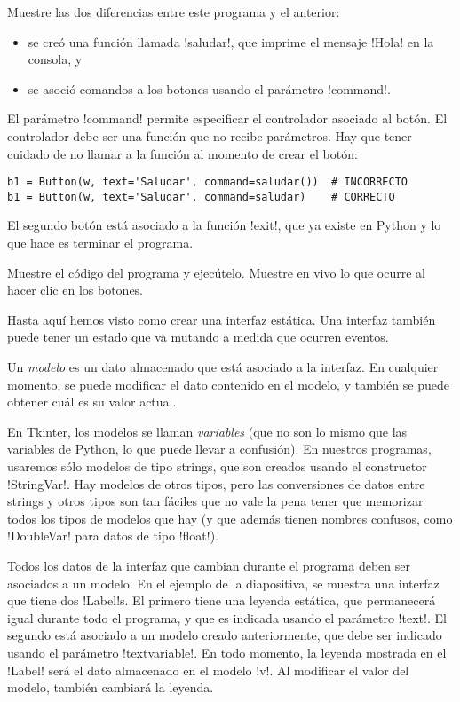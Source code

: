 \documentclass[10pt]{article}
\begin{document}
  Muestre las dos diferencias entre este programa y el anterior:
  \begin{itemize}
    \item se creó una función llamada \li!saludar!,
      que imprime el mensaje \li!Hola! en la consola, y
    \item se asoció comandos a los botones
      usando el parámetro \li!command!.
  \end{itemize}

  El parámetro \li!command! permite especificar el controlador asociado al botón.
  El controlador debe ser una función que no recibe parámetros.
  Hay que tener cuidado de no llamar a la función al momento de crear el botón:
  \begin{lstlisting}
b1 = Button(w, text='Saludar', command=saludar())  # INCORRECTO
b1 = Button(w, text='Saludar', command=saludar)    # CORRECTO
  \end{lstlisting}

  El segundo botón está asociado a la función \li!exit!,
  que ya existe en Python y lo que hace es terminar el programa.

  Muestre el código del programa y ejecútelo.
  Muestre en vivo lo que ocurre al hacer clic en los botones.


  Hasta aquí hemos visto como crear una interfaz estática.
  Una interfaz también puede tener un estado
  que va mutando a medida que ocurren eventos.

  Un \emph{modelo} es un dato almacenado
  que está asociado a la interfaz.
  En cualquier momento,
  se puede modificar el dato contenido en el modelo,
  y también se puede obtener cuál es su valor actual.

  En Tkinter, los modelos se llaman \emph{variables}
  (que no son lo mismo que las variables de Python,
  lo que puede llevar a confusión).
  En nuestros programas,
  usaremos sólo modelos de tipo strings,
  que son creados usando el constructor \li!StringVar!.
  Hay modelos de otros tipos,
  pero las conversiones de datos entre strings y otros tipos
  son tan fáciles que no vale la pena tener que memorizar
  todos los tipos de modelos que hay (y que además tienen nombres confusos,
  como \li!DoubleVar! para datos de tipo \li!float!).

  Todos los datos de la interfaz
  que cambian durante el programa
  deben ser asociados a un modelo.
  En el ejemplo de la diapositiva,
  se muestra una interfaz que tiene dos \li!Label!s.
  El primero tiene una leyenda estática,
  que permanecerá igual durante todo el programa,
  y que es indicada usando el parámetro \li!text!.
  El segundo está asociado a un modelo creado anteriormente,
  que debe ser indicado usando el parámetro \li!textvariable!.
  En todo momento,
  la leyenda mostrada en el \li!Label!
  será el dato almacenado en el modelo \li!v!.
  Al modificar el valor del modelo,
  también cambiará la leyenda.
\end{document}

